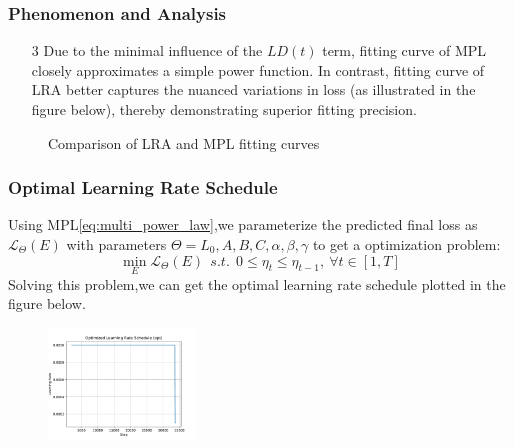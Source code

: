 \documentclass[aspectratio=169]{beamer}
\begin{document}
\begin{frame}
    \frametitle{Phenomenon and Analysis}
    \begin{enumerate}
        \item[3] Due to the minimal influence of the $LD(t)$ term,
            fitting curve of MPL closely approximates a simple power function.
            In contrast, fitting curve of LRA better captures the
            nuanced variations in loss (as illustrated in the figure
            below), thereby demonstrating superior fitting precision.
    \end{enumerate}
    \begin{figure}
        \centering

        \caption{Comparison of LRA and MPL fitting curves}\label{fig:figure3}
    \end{figure}
\end{frame}

\begin{frame}
    \frametitle{Optimal Learning Rate Schedule}
    Using MPL\eqref{eq:multi_power_law},we parameterize the predicted
    final loss as $\mathcal{L}_\Theta(E)$ with parameters $\Theta =
    {L_0,A,B,C,\alpha,\beta,\gamma}$ to get a optimization problem:
    $$
    \min_E \mathcal{L}_\Theta(E) \ \ s.t.
    \ \ 0\le\eta_t\le\eta_{t-1}, \ \forall t\in[1,T]
    $$
    Solving this problem,we can get the optimal learning rate
    schedule plotted in the figure below.
    \begin{figure}
        \centering
        \includegraphics[width=0.35\textwidth]{fig/opt/opt.pdf}
    \end{figure}

\end{frame}
\end{document}
